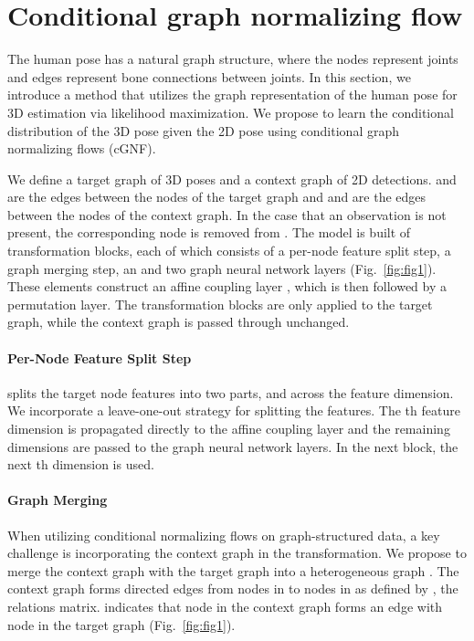 \documentclass{article} \usepackage{iclr2023_conference,times}
\begin{document}
\section{Conditional graph normalizing flow}
    The human pose has a natural graph structure, where the nodes represent joints and edges represent bone connections between joints.
    In this section, we introduce a method that utilizes the graph representation of the human pose for 3D estimation via likelihood maximization.
    We propose to learn the conditional distribution  of the 3D pose  given the 2D pose  using conditional graph normalizing flows (cGNF).
    
    We define a target graph  of 3D poses and a context graph  of 2D detections.
     and  are the edges between the nodes of the target graph and  and  are the edges between the nodes of the context graph.
    In the case that an observation is not present, the corresponding node is removed from .
    The model is built of  transformation blocks, each of which consists of a per-node feature split step, a graph merging step, an  \citep{Kingma_Dhariwal_2018} and two graph neural network layers \citep{Gori2005} (Fig.~\ref{fig:fig1}).
    These elements construct an affine coupling layer \citep{Dinh_Sohl-Dickstein_Bengio_2016}, which is then followed by a permutation layer.
    The transformation blocks are only applied to the target graph, while the context graph is passed through unchanged.
    
    \paragraph{Per-Node Feature Split Step} splits the target node features  into two parts,  and  across the feature dimension.
    We incorporate a leave-one-out strategy for splitting the features.
    The th feature dimension is propagated directly to the affine coupling layer and the remaining dimensions are passed to the graph neural network layers.
    In the next block, the next th dimension is used.

    \paragraph{Graph Merging}
    When utilizing conditional normalizing flows \cite{Winkler_Worrall_Hoogeboom_Welling_2019} on graph-structured data, a key challenge is incorporating the context graph in the transformation.
    We propose to merge the context graph  with the target graph  into a heterogeneous graph .
    The context graph  forms directed edges from nodes in  to nodes in  as defined by , the relations matrix.
     indicates that node  in the context graph forms an edge with node  in the target graph  (Fig.~\ref{fig:fig1}).
    
\end{document}

